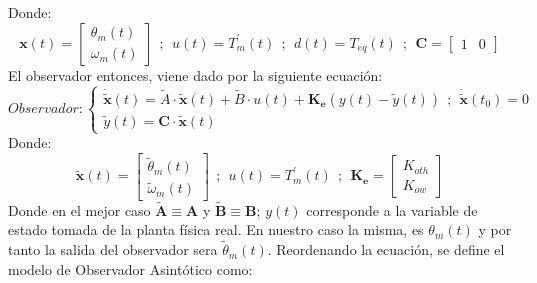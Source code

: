 \documentclass[10pt]{article}
\begin{document}
Donde:
\begin{equation}
	\textbf{x}(t)=
	\begin{bmatrix}
		\theta_m(t) \\ 
		\omega_m(t) 
	\end{bmatrix}
	\ \ ;\ \ u(t)=T_{m}^{'}(t)\ \ ;\ \ d(t)=T_{eq}(t)\ \ ;\ \ \textbf{C}=
	\begin{bmatrix}
		1 & 0
	\end{bmatrix}
\end{equation}
El observador entonces, viene dado por la siguiente ecuación:
\begin{equation}
	Observador :
	\begin{cases}
		\dot{\tilde{\textbf{x}}}(t)=\tilde{A}\cdot \tilde{\textbf{x}}(t)+\tilde{B}\cdot u(t)+\textbf{K}_\textbf{e}\left(y(t)-\tilde{y}(t)\right)\ \ ;\ \ \dot{\tilde{\textbf{x}}}(t_0)=0
		\\
		\tilde{y}(t)=\textbf{C}\cdot\tilde{\textbf{x}}(t)
	\end{cases}
\end{equation}
Donde:
\begin{equation}
	\tilde{\textbf{x}}(t)=
	\begin{bmatrix}
		\tilde{\theta}_m(t)\\
		\tilde{\omega}_m(t)
	\end{bmatrix}
	\ \ ;\ \ u(t)=T_{m}^{'}(t)\ \ ;\ \ \textbf{K}_\textbf{e}=
	\begin{bmatrix}
		K_{oth}\\
		K_{ow}
	\end{bmatrix}
\end{equation}
Donde en el mejor caso $\tilde{\textbf{A}} \equiv \textbf{A}$ y $\tilde{\textbf{B}} \equiv \textbf{B}$; $y(t)$ corresponde a la variable de estado tomada de la planta física real.
En nuestro caso la misma, es $\theta_m(t)$ y por tanto la salida del observador sera $\tilde{\theta}_m(t)$.
Reordenando la ecuación, se define el modelo de Observador Asintótico como:
\end{document}
